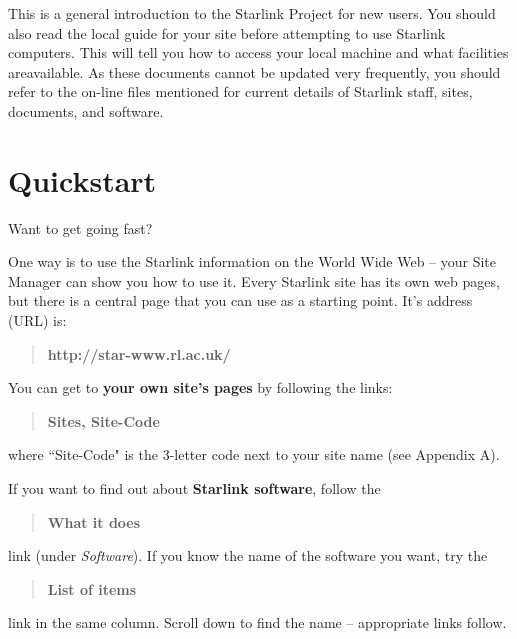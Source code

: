 \documentclass[twoside]{article}
\newcommand{\stardocabstract}{
This is a general introduction to the Starlink Project for new users.
You should also read the local guide for your site before attempting
to use Starlink computers.  This will tell you how to access your local
machine and what facilities areavailable.  As these documents cannot be
updated very frequently, you should refer to the on-line files
mentioned for current details of Starlink staff, sites, documents, and
software.
}
\newcommand{\htmladdnormallink}[2]{#1}
\newenvironment{latexonly}{}{}
\newcommand{\htmlref}[2]{#1}
\newcommand{\latexonlytoc}[0]{\tableofcontents}
\renewcommand{\thepage}{\roman{page}}
\begin{document}
\stardocabstract
\newpage
\begin{latexonly}
   \setlength{\parskip}{0mm}
   \latexonlytoc
   \setlength{\parskip}{\medskipamount}
\end{latexonly}
\newpage
\renewcommand{\thepage}{\arabic{page}}
\setcounter{page}{1}

\section{Quickstart}

Want to get going fast?

One way is to use the Starlink information on the World Wide Web -- your
Site Manager can show you how to use it.
Every Starlink site has its own web pages, but there is a central page that
you can use as a starting point.
It's address (URL) is:
\begin{quote}
\htmladdnormallink{\bf http://star-www.rl.ac.uk/}{http://star-www.rl.ac.uk/}
\end{quote}
You can get to {\bf your own site's pages} by following the links:
\begin{quote}
\htmladdnormallink{\bf Sites}{http://star-www.rl.ac.uk/sites.html},
{\bf Site-Code}
\end{quote}
where ``Site-Code" is the 3-letter code next to your site name
(see \htmlref{Appendix A}{AppendixA}).

If you want to find out about {\bf Starlink software}, follow the
\begin{quote}
\htmladdnormallink{\bf What it does}
{http://star-www.rl.ac.uk/star/docs/sun1.htx/sun1.html}
\end{quote}
link (under {\em Software}).
If you know the name of the software you want, try the
\begin{quote}
\htmladdnormallink{\bf List of items}
{http://star-www.rl.ac.uk/softalpha.html}
\end{quote}
link in the same column.
Scroll down to find the name -- appropriate links follow.
\end{document}
